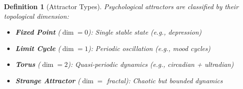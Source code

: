 \documentclass[11pt,twoside]{book}
\newtheorem{definition}{Definition}[chapter]
\begin{document}
\begin{definition}[Attractor Types]
\label{def:attractor-types}
Psychological attractors are classified by their topological dimension:
\begin{itemize}
    \item \textbf{Fixed Point} ($\dim = 0$): Single stable state (e.g., depression)
    \item \textbf{Limit Cycle} ($\dim = 1$): Periodic oscillation (e.g., mood cycles)
    \item \textbf{Torus} ($\dim = 2$): Quasi-periodic dynamics (e.g., circadian + ultradian)
    \item \textbf{Strange Attractor} ($\dim = $ fractal): Chaotic but bounded dynamics
\end{itemize}
\end{definition}
\end{document}
